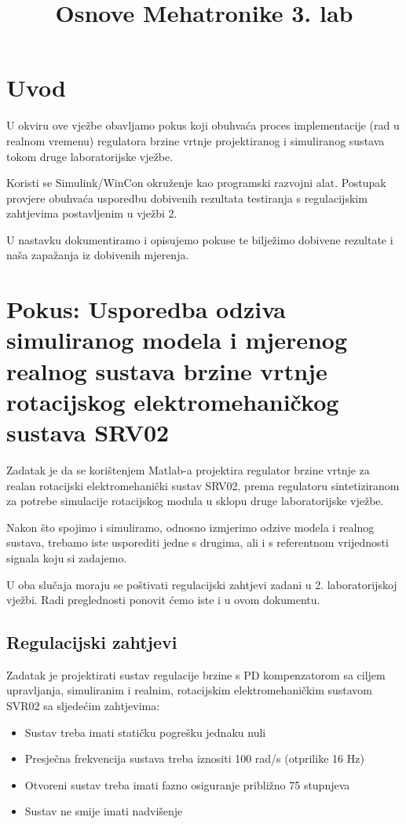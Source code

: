\documentclass[12pt,a4paper]{article}
\title{Osnove Mehatronike 3. lab}
\begin{document}
\section{Uvod}
U okviru ove vježbe obavljamo pokus koji obuhvaća proces implementacije
(rad u realnom vremenu) regulatora brzine vrtnje projektiranog i simuliranog sustava tokom druge laboratorijske vježbe. 

Koristi se Simulink/WinCon okruženje kao programski razvojni alat. Postupak provjere obuhvaća usporedbu dobivenih rezultata testiranja s regulacijskim zahtjevima postavljenim u vježbi 2.

U nastavku dokumentiramo i opisujemo pokuse te bilježimo dobivene rezultate i naša zapažanja iz dobivenih mjerenja.

\newpage

\section{Pokus: Usporedba odziva simuliranog modela i mjerenog realnog sustava brzine vrtnje rotacijskog elektromehaničkog sustava SRV02}

Zadatak je da se korištenjem Matlab-a projektira regulator brzine vrtnje za realan rotacijski elektromehanički sustav SRV02, prema regulatoru sintetiziranom za potrebe simulacije rotacijskog modula u sklopu druge laboratorijske vježbe.

Nakon što spojimo i simuliramo, odnosno izmjerimo odzive modela i realnog sustava, trebamo iste usporediti jedne s drugima, ali i s referentnom vrijednosti signala koju si zadajemo.

U oba slučaja moraju se poštivati regulacijski zahtjevi zadani u 2. laboratorijskoj vježbi. Radi preglednosti ponovit ćemo iste i u ovom dokumentu.

\subsection{Regulacijski zahtjevi}
\label{sec:zahtjevi}
Zadatak je projektirati sustav regulacije brzine s PD kompenzatorom sa ciljem upravljanja, simuliranim i realnim, rotacijskim elektromehaničkim sustavom SVR02 sa sljedećim zahtjevima:

\begin{itemize}
  \item Sustav treba imati statičku pogrešku jednaku nuli
  \item Presječna frekvencija sustava treba iznositi 100 rad/s (otprilike 16 Hz)
  \item Otvoreni sustav treba imati fazno osiguranje približno 75 stupnjeva
  \item Sustav ne smije imati nadvišenje
\end{itemize}
\end{document}
